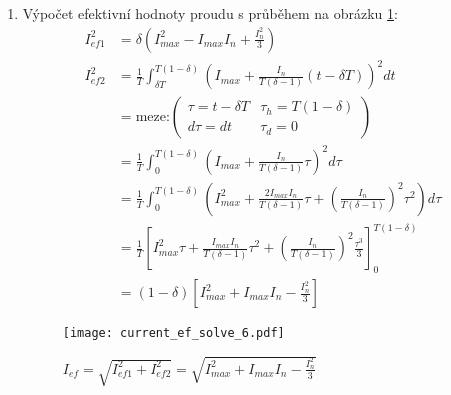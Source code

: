 {\begin{enumerate}
      \item Výpočet efektivní hodnoty proudu s průběhem na obrázku \ref{es:fig_current_ef_solve_6}:
        {\footnotesize
          \begin{align*}
            I_{ef1}^2 &=  \delta\left(I_{max}^2-I_{max}I_n+\frac{I_n^2}{3}\right)         \\
            I_{ef2}^2 &=  \frac{1}{T}\int_{\delta T}^{T(1-\delta)}\left(I_{max}
                         +\frac{I_n}{T(\delta-1)}(t-\delta T)\right)^2dt                  \\
                      &=  \text{meze:}\left(
                            \begin{array}{cc}
                                \tau = t -\delta T & \tau_h = T(1-\delta)  \\
                               d\tau = dt          & \tau_d = 0
                            \end{array}
                          \right) \\ \nonumber
                      &=  \frac{1}{T}\int_0^{T(1-\delta)}\left(I_{max} +
                          \frac{I_n}{T(\delta-1)}\tau\right)^2d\tau                       \\
                      &=  \frac{1}{T}\int_0^{T(1-\delta)}\left(I_{max}^2 +
                          \frac{2I_{max}I_n}{T(\delta-1)}\tau +
                          \left(\frac{I_n}{T(\delta-1)}\right)^2\tau^2\right)d\tau        \\
                      &=  \frac{1}{T}\left[I_{max}^2\tau +
                          \frac{I_{max}I_n}{T(\delta-1)}\tau^2 +
                          \left(\frac{I_n}{T(\delta-1)}\right)^2
                          \frac{\tau^3}{3}\right]_0^{T(1-\delta)}                         \\
                      &=  (1-\delta)\left[I_{max}^2+I_{max}I_n - \frac{I_n^2}{3}\right]
         \end{align*}
        } %
         \begin{figure}[ht!]
           \centering
           \texttt{[image: current\_ef\_solve\_6.pdf]}
           \caption{\(I_{ef} = \sqrt{I_{ef1}^2+I_{ef2}^2} = \sqrt{I_{max}^2+I_{max}I_{n} - 
                    \frac{I_n^2}{3}}\) }
           \label{es:fig_current_ef_solve_6}
         \end{figure}


\end{enumerate}}
